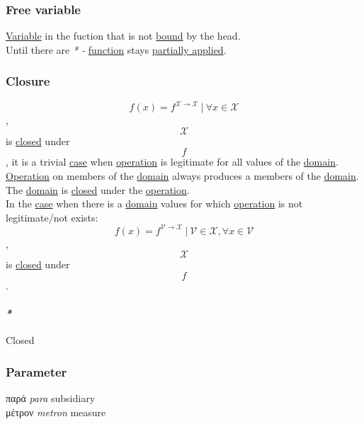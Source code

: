 \documentclass[11pt]{article}
\begin{document}
\subsubsection{\label{org6cbbfda}Free variable}
\label{sec:orga8821cd}
\hyperref[org301bab5]{Variable} in the fuction that is not \hyperref[org7d65bda]{bound} by the head.\\
Until there are \emph{* -} \hyperref[orgeb5cddb]{function} stays \hyperref[orgd8b581f]{partially applied}.\\

\subsubsection{\label{org953a876}Closure}
\label{sec:orgc31c179}
$$ f(x) = f^{\mathcal{X \to X}} \ | \ \forall x \in \mathcal{X} $$, $$ \mathcal{X} $$ is \hyperref[orgfa67abb]{closed} under $$ f $$, it is a trivial \hyperref[org96bceb0]{case} when \hyperref[org87d485b]{operation} is legitimate for all values of the \hyperref[orgf784585]{domain}.\\

\hyperref[org87d485b]{Operation} on members of the \hyperref[orgf784585]{domain} always produces a members of the \hyperref[orgf784585]{domain}. The \hyperref[orgf784585]{domain} is \hyperref[orgfa67abb]{closed} under the \hyperref[org87d485b]{operation}.\\

In the \hyperref[org96bceb0]{case} when there is a \hyperref[orgf784585]{domain} values for which \hyperref[org87d485b]{operation} is not legitimate/not exists:\\

$$ f(x) = f^{\mathcal{V \to X}} \ | \ \mathcal{V \in X}, \forall x \in \mathcal{V} $$, $$ \mathcal{X} $$ is \hyperref[orgfa67abb]{closed} under $$ f $$.\\

\paragraph{\emph{*}}
\label{sec:orgc9b4e18}

\label{orgfa67abb}Closed\\

\subsubsection{\label{org45d4a16}Parameter}
\label{sec:orgfbc0aa5}
παρά \emph{para} subsidiary\\
μέτρον \emph{metron} measure\\
\end{document}
